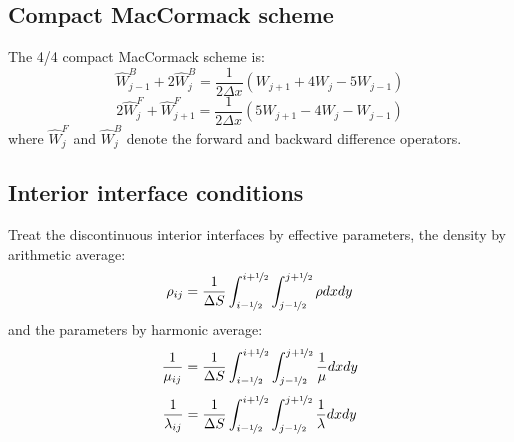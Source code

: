 \subsection{Compact MacCormack scheme}
The 4/4 compact MacCormack scheme is:
\[ \hat W_{j-1}^B+2\hat W_j^B=\frac{1}{2\Delta x}(W_{j+1}+4W_j-5W_{j-1}) \]
\[ 2\hat W_j^F+\hat W_{j+1}^F=\frac{1}{2\Delta x}(5W_{j+1}-4W_j-W_{j-1}) \]
where $\hat W_j^F$ and $\hat W_j^B$ denote the forward and
backward difference operators.

\subsection{Interior interface conditions}
Treat the discontinuous interior interfaces by effective parameters,
the density by arithmetic average:
\[ \rho_{ij}=\frac{1}{\Delta S}\int_{i-\nicefrac{1}{2}}^{i+\nicefrac{1}{2}}\int_{j-\nicefrac{1}{2}}^{j+\nicefrac{1}{2}}\rho dxdy \]
and the \Lame parameters by harmonic average:
\[ \frac{1}{\mu_{ij}}=\frac{1}{\Delta S}\int_{i-\nicefrac{1}{2}}^{i+\nicefrac{1}{2}}\int_{j-\nicefrac{1}{2}}^{j+\nicefrac{1}{2}}\frac{1}{\mu}dxdy \]
\[ \frac{1}{\lambda_{ij}}=\frac{1}{\Delta S}\int_{i-\nicefrac{1}{2}}^{i+\nicefrac{1}{2}}\int_{j-\nicefrac{1}{2}}^{j+\nicefrac{1}{2}}\frac{1}{\lambda}dxdy \]

